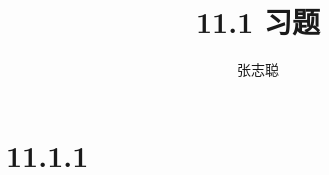 \documentclass{article}
\begin{document}
\title{11.1 习题}
\author{张志聪}
\maketitle

\section*{11.1.1}
\end{document}
